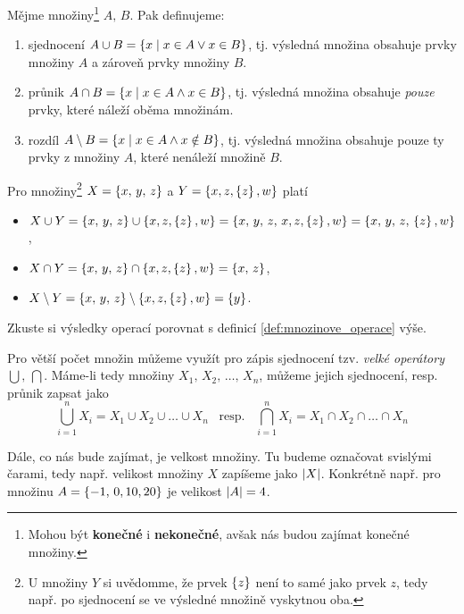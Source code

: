 \begin{definition}\label{def:mnozinove_operace}
    Mějme množiny\footnote{Mohou být \textbf{konečné} i \textbf{nekonečné}, avšak nás budou zajímat konečné množiny.} $A,\,B$. Pak definujeme:
    \begin{enumerate}[label=(\roman*)]
        \item sjednocení $A \cup B = \left\{x \;\middle\vert\; x\in A \lor x\in B\right\}$, tj. výsledná množina obsahuje prvky množiny $A$ a zároveň prvky množiny $B$.
        \item průnik $A \cap B = \left\{x \;\middle\vert\; x\in A \land x\in B\right\}$, tj. výsledná množina obsahuje \emph{pouze} prvky, které náleží oběma množinám.
        \item rozdíl $A \setminus B = \left\{x \;\middle\vert\; x\in A \land x \notin B\right\}$, tj. výsledná množina obsahuje pouze ty prvky z množiny $A$, které nenáleží množině $B$.
    \end{enumerate}
\end{definition}

\begin{example}
    Pro množiny\footnote{U množiny $Y$ si uvědomme, že prvek $\left\{z\right\}$ není to samé jako prvek $z$, tedy např. po sjednocení se ve výsledné množině vyskytnou oba.} $X=\left\{x,\,y,\,z\right\}$ a $Y=\left\{x,z,\left\{z\right\},w\right\}$ platí
    \begin{itemize}
        \item $X \cup Y = \left\{x,\,y,\,z\right\} \cup \left\{x,z,\left\{z\right\},w\right\}=\left\{x,\,y,\,z,\,x,z,\left\{z\right\},w\right\}=\left\{x,\,y,\,z,\,\left\{z\right\},w\right\}$,
        \item $X \cap Y = \left\{x,\,y,\,z\right\} \cap \left\{x,z,\left\{z\right\},w\right\}=\left\{x,\,z\right\}$,
        \item $X \setminus Y = \left\{x,\,y,\,z\right\} \setminus \left\{x,z,\left\{z\right\},w\right\}=\left\{y\right\}$.
    \end{itemize}
    Zkuste si výsledky operací porovnat s definicí \ref{def:mnozinove_operace} výše.
\end{example}

Pro větší počet množin můžeme využít pro zápis sjednocení tzv. \emph{velké operátory} $\bigcup,\,\bigcap$. Máme-li tedy množiny $X_1,\,X_2,\,\dots,\,X_n$, můžeme jejich sjednocení, resp. průnik zapsat jako
\begin{equation*}
    \bigcup\limits_{i=1}^{n}X_i = X_1 \cup X_2 \cup \dots \cup X_n\;\;\;\text{resp.}\;\;\;\bigcap\limits_{i=1}^{n}X_i = X_1 \cap X_2 \cap \dots \cap X_n
\end{equation*}

Dále, co nás bude zajímat, je velkost množiny. Tu budeme označovat svislými čarami, tedy např. velikost množiny $X$ zapíšeme jako $\left| X \right|$. Konkrétně např. pro množinu $A=\left\{-1,\,0,10,20\right\}$ je velikost $\left| A \right|=4$.

